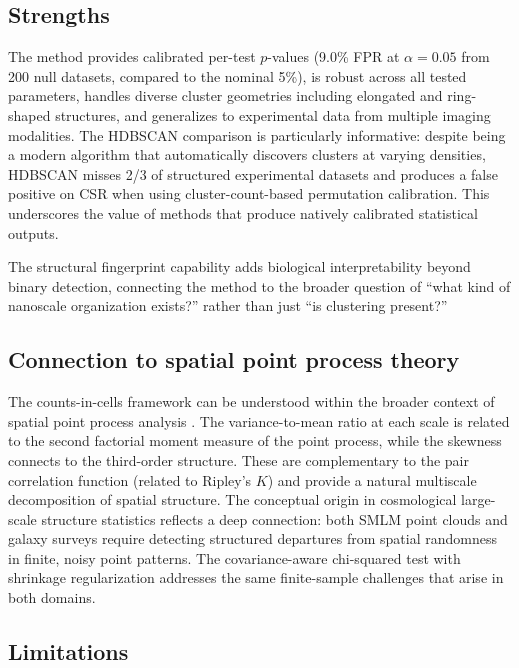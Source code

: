 \documentclass[11pt]{article}
\begin{document}
\subsection{Strengths}

The method provides calibrated per-test $p$-values (9.0\% FPR at
$\alpha = 0.05$ from 200 null datasets, compared to the nominal 5\%),
is robust across all tested parameters, handles diverse cluster
geometries including elongated and ring-shaped structures, and
generalizes to experimental data from multiple imaging modalities. The
HDBSCAN comparison is particularly informative: despite being a modern
algorithm that automatically discovers clusters at varying densities,
HDBSCAN misses 2/3 of structured experimental datasets and produces a
false positive on CSR when using cluster-count-based permutation
calibration. This underscores the value of methods that produce natively
calibrated statistical outputs.

The structural fingerprint capability adds biological interpretability
beyond binary detection, connecting the method to the broader question of
``what kind of nanoscale organization exists?'' rather than just ``is
clustering present?''

\subsection{Connection to spatial point process theory}

The counts-in-cells framework can be understood within the broader
context of spatial point process analysis \citep{diggle2013}. The
variance-to-mean ratio at each scale is related to the second factorial
moment measure of the point process, while the skewness connects to the
third-order structure. These are complementary to the pair correlation
function (related to Ripley's $K$) and provide a natural multiscale
decomposition of spatial structure. The conceptual origin in cosmological
large-scale structure statistics \citep{colombi1994,szapudi1996}
reflects a deep connection: both SMLM point clouds and galaxy surveys
require detecting structured departures from spatial randomness in
finite, noisy point patterns. The covariance-aware chi-squared test with
shrinkage regularization addresses the same finite-sample challenges
that arise in both domains.

\subsection{Limitations}
\label{sec:discussion-limitations}
\end{document}
